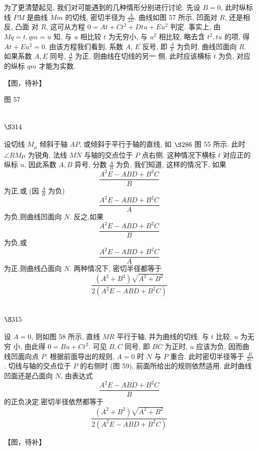 为了更清楚起见, 我们对可能遇到的几种情形分别进行讨论. 先设 $B=0$, 此时纵标 线 $P M$ 是曲线 $M m$ 的切线, 密切半径为 $\frac{A}{2 E}$. 曲线如图 57 所示, 凹面对 $R$, 还是相反, 凸面 对 $R$, 这可从方程 $0=A t+C t^{2}+D t u+E u^{2}$ 判定. 事实上, 由 $M q=t, q m=u$ 知, 与 $u$ 相比较 $t$ 为无穷小, 与 $u^{2}$ 相比较, 略去含 $t^{2}, t u$ 的项, 得 $A t+E u^{2}=0$. 由该方程我们看到, 系数 $A$, $E$ 反号, 即 $\frac{A}{E}$ 为负时, 曲线凹面向 $R$. 如果系数 $A, E$ 同号, $\frac{A}{E}$ 为正, 则曲线在切线的另一 侧. 此时应该横标 $t$ 为负, 对应的纵标 $q m$ 才能为实数.


【图，待补】

图 57

\section{$\S 314$}

设切线 $M_{\mu}$ 倾斜于轴 $A P$, 或倾斜于平行于轴的直线, 如 $\S 286$ 图 55 所示. 此时 $\angle R M \mu$ 为锐角, 法线 $M N$ 与轴的交点位于 $P$ 点右侧. 这种情况下横标 $t$ 对应正的纵标 $u$, 因此系数 $A, B$ 异号, 分数 $\frac{A}{B}$ 为负. 我们知道, 这样的情况下, 如果
\[
\frac{A^{2} E-A B D+B^{2} C}{B}
\]
为正,或 (因 $\frac{A}{B}$ 为负)
\[
\frac{A^{2} E-A B D+B^{2} C}{A}
\]
为负,则曲线凹面向 $N$. 反之,如果
\[
\frac{A^{2} E-A B D+B^{2} C}{B}
\]
为负,或
\[
\frac{A^{2} E-A B D+B^{2} C}{A}
\]
为正,则曲线凸面向 $N$. 两种情况下, 密切半径都等于
\[
\frac{\left(A^{2}+B^{2}\right) \sqrt{A^{2}+B^{2}}}{2\left(A^{2} E-A B D+B^{2} C\right)}
\]
\section{$\S 315$}

设 $A=0$, 则如图 58 所示, 直线 $M R$ 平行于轴, 并为曲线的切线. 与 $t$ 比较, $u$ 为无穷 小, 由此得 $0=B u+C t^{2}$. 可见 $B, C$ 同号, 即 $B C$ 为正时, $u$ 应该为负, 因而曲线凹面向点 $P$. 根据前面导出的规则, $A=0$ 时 $N$ 与 $P$ 重合. 此时密切半径等于 $\frac{B}{2 C}$. 切线与轴的交点位于 $P$ 的右侧时 (图 59), 前面所给出的规则依然适用. 此时曲线凹面还是凸面向 $N$, 由表达式
\[
\frac{A^{2} E-A B D+B^{2} C}{B}
\]
的正负决定.密切半径依然都等于
\[
\frac{\left(A^{2}+B^{2}\right) \sqrt{A^{2}+B^{2}}}{2\left(A^{2} E-A B D+B^{2} C\right)}
\]

【图，待补】

